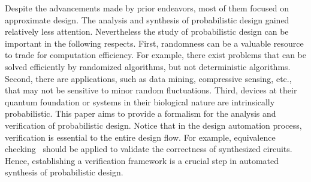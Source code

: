     Despite the advancements made by prior endeavors, most of them focused on approximate design.
    The analysis and synthesis of probabilistic design gained relatively less attention.
    Nevertheless the study of probabilistic design can be important in the following respects.
    First, randomness can be a valuable resource to trade for computation efficiency.
    For example, there exist problems that can be solved efficiently by randomized algorithms, but not deterministic algorithms.
    Second, there are applications, such as data mining, compressive sensing, etc., that may not be
    sensitive to minor random fluctuations.
    Third, devices at their quantum foundation or systems in their biological nature are intrinsically probabilistic.
    This paper aims to provide a formalism for the analysis and verification of probabilistic design.
    Notice that in the design automation process, verification is essential to the entire design flow.
    For example, equivalence checking~\cite{Kuehlmann1997,Mishchenko2006} should be applied to validate the correctness of synthesized circuits.
    Hence, establishing a verification framework is a crucial step in automated synthesis of probabilistic design.

